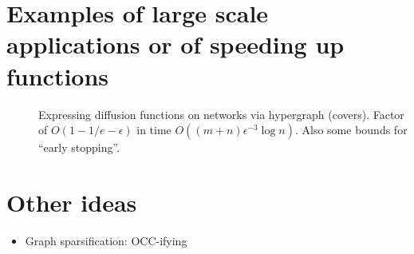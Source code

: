\documentclass{article}
\begin{document}
\section{Examples of large scale applications or of speeding up functions}

\begin{description}
\item[\citet{borgs14}] Expressing diffusion functions on networks via hypergraph (covers). Factor of $O(1 - 1/e - \epsilon)$ in time $O((m+n)\epsilon^{-3} \log n)$. Also some bounds for ``early stopping''.
\end{description}




\section{Other ideas}

\begin{itemize}
\item Graph sparsification: OCC-ifying \citet{kelner11}
\end{itemize}




\end{document}
